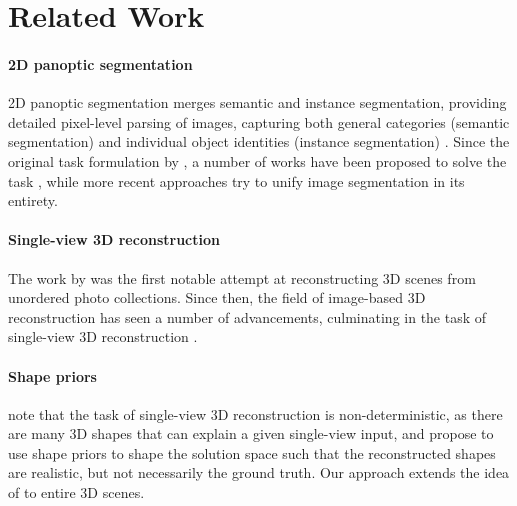 \section{Related Work}
\label{sec:related}

\paragraph{2D panoptic segmentation}
2D panoptic segmentation merges semantic and instance segmentation, providing detailed pixel-level parsing of images, capturing both general categories (semantic segmentation)
and individual object identities (instance segmentation) \citep{kirillov2019panoptic}. Since the original task formulation by \citet{kirillov2019panoptic}, a number of works
have been proposed to solve the task \cite{wang2020axial, cheng2020panoptic, mohan2021efficientps, Li_2021_CVPR, Wang_2021_CVPR, Li_2022_CVPR, Kundu_2022_CVPR, Cheng_2022_CVPR, Yu_2022_CVPR, Xu_2023_CVPR, Chen_2023_ICCV, li2023mask, yu2023convolutions},
while more recent approaches \citep{Jain_2023_CVPR} try to unify image segmentation in its entirety.

\vspace*{-5mm}
\paragraph{Single-view 3D reconstruction}
The work by \citet{snavely2006photo} was the first notable attempt at reconstructing 3D scenes from unordered photo collections. Since then, the field of image-based 3D reconstruction
has seen a number of advancements, culminating in the task of single-view 3D reconstruction \citep{choy20163d, wang2018pixel2mesh, mescheder2019occupancy, huang2019perspectivenet, shin20193d, denninger20203d, nie2020total3dunderstanding}.

\vfill
\paragraph{Shape priors}
\citet{wu2018learning} note that the task of single-view 3D reconstruction is non-deterministic, as there are many 3D shapes that can explain a given single-view input, and propose
to use shape priors to shape the solution space such that the reconstructed shapes are realistic, but not necessarily the ground truth. Our approach extends the idea of \citet{wu2018learning} to entire 3D scenes.

\vspace*{-5mm}
